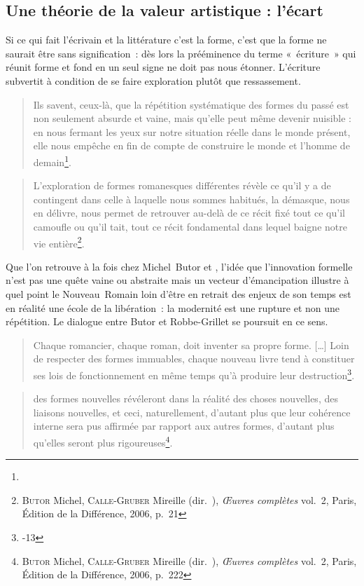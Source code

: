 \documentclass[12pt, a4paper]{article}
\begin{document}
\subsection{Une théorie de la valeur artistique : l'écart}
\label{theorie}
Si ce qui fait l'écrivain et la littérature c'est la forme, c'est que la forme ne saurait être sans signification~: dès lors la prééminence du terme «~écriture~» qui réunit forme et fond en un seul signe ne doit pas nous étonner. L'écriture subvertit à condition de se faire exploration plutôt que ressassement. 
\begin{quote}
    Ils savent, ceux-là, que la répétition systématique des formes du passé est non seulement absurde et vaine, mais qu’elle peut même devenir nuisible : en nous fermant les yeux sur notre situation réelle dans le monde présent, elle nous empêche en fin de compte de construire le monde et l’homme de demain\footnote{}.
\end{quote}
\begin{quote}
    L’exploration de formes romanesques différentes révèle ce qu’il y a de contingent dans celle à laquelle nous sommes habitués, la démasque, nous en délivre, nous permet de retrouver au-delà de ce récit fixé tout ce qu’il camoufle ou qu’il tait, tout ce récit fondamental dans lequel baigne notre vie entière\footnote{\textsc{Butor} Michel, \textsc{Calle-Gruber} Mireille (dir.~), \textit{Œuvres complètes} vol.~2, Paris, Édition de la Différence, 2006, p.~21}.
\end{quote}
Que l'on retrouve à la fois chez Michel~Butor et \robbe, l'idée que l'innovation formelle n'est pas une quête vaine ou abstraite mais un vecteur d'émancipation illustre à quel point le Nouveau~Romain loin d'être en retrait des enjeux de son temps est en réalité une école de la libération~: la modernité est une rupture et non une répétition. Le dialogue entre Butor et Robbe-Grillet se poursuit en ce sens.
\begin{quote}
    Chaque romancier, chaque roman, doit inventer sa propre forme. […] Loin de respecter des formes immuables, chaque nouveau livre tend à constituer ses lois de fonctionnement en même temps qu'à produire leur destruction\footnote{-13}.
\end{quote}
\begin{quote}
    des formes nouvelles révéleront dans la réalité des choses nouvelles, des liaisons nouvelles, et ceci, naturellement, d’autant plus que leur cohérence interne sera pus affirmée par rapport aux autres formes, d’autant plus qu’elles seront plus rigoureuses\footnote{\textsc{Butor} Michel, \textsc{Calle-Gruber} Mireille (dir.~), \textit{Œuvres complètes} vol.~2, Paris, Édition de la Différence, 2006, p.~222}.         
\end{quote}
\end{document}
